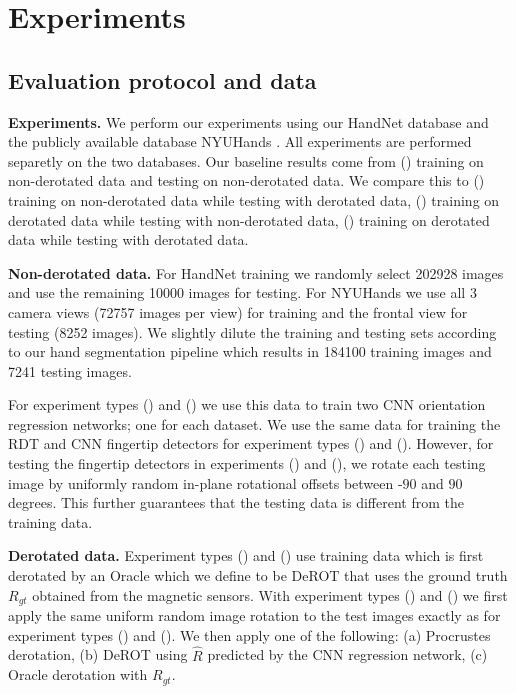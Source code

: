 \documentclass{bmvc2k}
\newcommand{\RNum}[1]{\uppercase\expandafter{\romannumeral #1\relax}}
\begin{document}
\section{Experiments} \label{sec:experiments}


\subsection{Evaluation protocol and data} \label{sec:evaluation}

\textbf{Experiments.} We perform our experiments using our HandNet database and the publicly available database NYUHands \cite{tompson14tog}. All experiments are performed separetly on the two databases. Our baseline results come from (\RNum{1}) training on non-derotated data and testing on non-derotated data. We compare this to (\RNum{2}) training on non-derotated data while testing with derotated data, (\RNum{3}) training on derotated data while testing with non-derotated data, (\RNum{4}) training on derotated data while testing with derotated data. 

\textbf{Non-derotated data.} For HandNet training we randomly select 202928 images and use the remaining 10000 images for testing. For NYUHands we use all 3 camera views (72757 images per view) for training and the frontal view for testing (8252 images). We slightly dilute the training and testing sets according to our hand segmentation pipeline which results in 184100 training images and 7241 testing images. 

For experiment types (\RNum{2}) and (\RNum{4}) we use this data to train two CNN orientation regression networks; one for each dataset. We use the same data for training the RDT and CNN fingertip detectors for experiment types (\RNum{1}) and (\RNum{2}). However, for testing the fingertip detectors in experiments (\RNum{1}) and (\RNum{3}), we rotate each testing image by uniformly random in-plane rotational offsets between -$90$ and $90$ degrees. This further guarantees that the testing data is different from the training data. 

\textbf{Derotated data.} Experiment types (\RNum{3}) and (\RNum{4}) use training data which is first derotated by an Oracle which we define to be DeROT that uses the ground truth $R_{gt}$ obtained from the magnetic sensors. With experiment types (\RNum{2}) and (\RNum{4}) we first apply the same uniform random image rotation to the test images exactly as for experiment types (\RNum{1}) and (\RNum{2}). We then apply one of the following: (a) Procrustes derotation, (b) DeROT using $\hat{R}$ predicted by the CNN regression network, (c) Oracle derotation with $R_{gt}$. 
\end{document}
